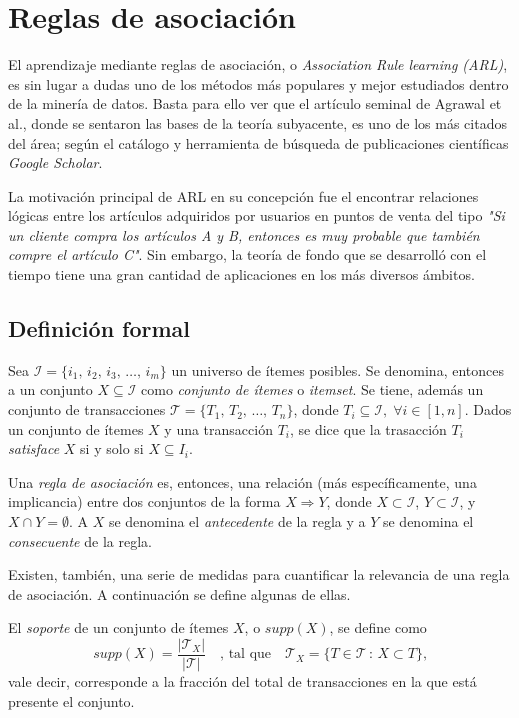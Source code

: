 \section{Reglas de asociación}

El aprendizaje mediante reglas de asociación, o \textit{Association Rule learning (ARL)}, es sin lugar a dudas uno de los métodos más populares y mejor estudiados dentro de la minería de datos. Basta para ello ver que el artículo seminal de Agrawal et al.\cite{agrawal1993mining}, donde se sentaron las bases de la teoría subyacente, es uno de los más citados del área; según el catálogo y herramienta de búsqueda de publicaciones científicas \textit{Google Scholar}.

La motivación principal de ARL en su concepción fue el encontrar relaciones lógicas entre los artículos adquiridos por usuarios en puntos de venta del tipo \textit{"Si un cliente compra los artículos A y B, entonces es muy probable que también compre el artículo C"}. Sin embargo, la teoría de fondo que se desarrolló con el tiempo tiene una gran cantidad de aplicaciones en los más diversos ámbitos.

\subsection{Definición formal}

Sea $\mathcal{I} = \{i_1,\,i_2,\,i_3,\,\ldots ,\,i_m\}$ un universo de ítemes posibles. Se denomina, entonces a un conjunto $X \subseteq \mathcal{I}$ como \textit{conjunto de ítemes} o \textit{itemset}. Se tiene, además un conjunto de transacciones $\mathcal{T} = \{T_1,\,T_2,\,\ldots,\,T_n\}$, donde $T_i \subseteq \mathcal{I}, \; \forall i \in {[1,n]}$. Dados un conjunto de ítemes $X$ y una transacción $T_i$, se dice que la trasacción $T_i$ \textit{satisface} $X$ si y solo si $X \subseteq I_i$.

Una \textit{regla de asociación} es, entonces, una relación (más específicamente, una implicancia) entre dos conjuntos de la forma $X \Rightarrow Y$, donde $X \subset \mathcal{I}$, $Y \subset \mathcal{I}$, y $X \cap Y = \emptyset$. A $X$ se denomina el \textit{antecedente} de la regla y a $Y$ se denomina el \textit{consecuente} de la regla.

Existen, también, una serie de medidas para cuantificar la relevancia de una regla de asociación. A continuación se define algunas de ellas.

El \textit{soporte} de un conjunto de ítemes $X$, o $\mathit{supp}(X)$, se define como $$\mathit{supp}(X) = \frac{|\mathcal{T}_X|}{|\mathcal{T}|} \quad \text{, tal que} \quad \mathcal{T}_X = \{T \in \mathcal{T} \, : \, X \subset T \}\text{,}$$ vale decir, corresponde a la fracción del total de transacciones en la que está presente el conjunto.

